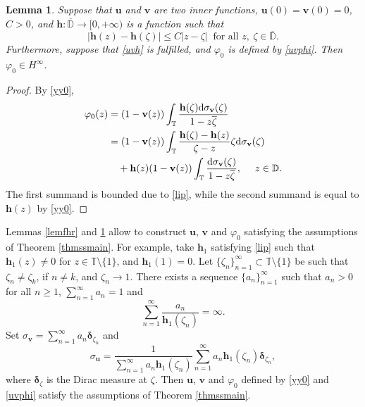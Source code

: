 \documentclass[a4paper,oneside,11pt]{amsart}
\numberwithin{equation}{section}
\theoremstyle{plain}
\newtheorem{lemma}[theorem]{Lemma}
\theoremstyle{definition}
\begin{document}
\begin{lemma}\label{lemlip} Suppose that ${\mathbf u}$ and ${\mathbf v}$ are two inner functions, 
 ${\mathbf u}(0)={\mathbf v}(0)=0$, $C>0$, and $\mathbf h\colon\overline{\mathbb D}\to[0,+\infty)$ is a function 
such that 
\begin{equation}\label{lip}|{\mathbf h}(z)-{\mathbf h}(\zeta)|\leq C|z-\zeta| \ \text{ for all }z,\  \zeta\in\overline{\mathbb D}. 
\end{equation}
Furthermore, suppose that \eqref{uvh} is fulfilled, and $\varphi_0$ is defined by \eqref{uvphi}. 
Then $\varphi_0\in H^\infty$. 
\end{lemma}

\begin{proof} By \eqref{yy0},
\begin{equation*}
\begin{aligned}\varphi_0(z)& =(1-{\mathbf v}(z))
\int_{\mathbb T}\frac{{\mathbf h}(\zeta)\text{\rm d}\sigma_{\mathbf v}(\zeta)}{1-z\overline\zeta}\\&
=(1-{\mathbf v}(z))\int_{\mathbb T}
\frac{{\mathbf h}(\zeta)-{\mathbf h}(z)}{\zeta-z}\zeta\text{\rm d}\sigma_{\mathbf v}(\zeta)
\\&\quad+{\mathbf h}(z)(1-{\mathbf v}(z))
\int_{\mathbb T}\frac{\text{\rm d}\sigma_{\mathbf v}(\zeta)}{1-z\overline\zeta},   
\ \   \ \ z\in\mathbb D.\end{aligned}\end{equation*}
The first summand is bounded due to \eqref{lip}, while the second summand is equal to ${\mathbf h}(z)$ by \eqref{yy0}. 
\end{proof}

Lemmas \ref{lemfhr} and \ref{lemlip} allow to construct ${\mathbf u}$, ${\mathbf v}$ and $\varphi_0$ satisfying 
the assumptions of Theorem \ref{thmssmain}. For example, take ${\mathbf h}_1$ satisfying \eqref{lip} such that 
$ {\mathbf h}_1(z)\neq 0$ for $z\in\mathbb T\setminus\{1\}$, and   ${\mathbf h}_1(1)=0$. 
Let $\{\zeta_n\}_{n=1}^\infty\subset\mathbb T\setminus\{1\}$ 
be such that $\zeta_n\neq\zeta_k$, if $n\neq k$, and $\zeta_n\to 1$. There exists a sequence $\{a_n\}_{n=1}^\infty$ such that 
$a_n>0$ for all $n\geq 1$, $\sum_{n=1}^\infty a_n=1$ and $$\sum_{n=1}^\infty \frac{a_n}{{\mathbf h}_1(\zeta_n)}= \infty.$$
Set $\sigma_{\mathbf v}=\sum_{n=1}^\infty a_n{\boldsymbol\delta}_{\zeta_n}$ and 
$$\sigma_{\mathbf u} = \frac{1}{\sum_{n=1}^\infty a_n{\mathbf h}_1(\zeta_n)} \sum_{n=1}^\infty a_n{\mathbf h}_1(\zeta_n){\boldsymbol\delta}_{\zeta_n},$$
where ${\boldsymbol\delta}_{\zeta}$ is the Dirac measure at $\zeta$.  Then ${\mathbf u}$, ${\mathbf v}$ and $\varphi_0$ defined by \eqref{yy0} and \eqref{uvphi} satisfy 
the assumptions of Theorem \ref{thmssmain}. 
\end{document}
